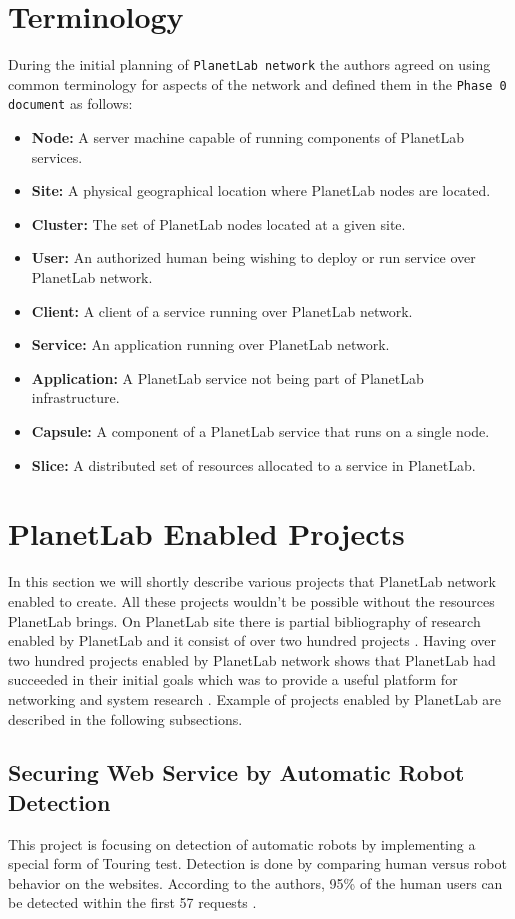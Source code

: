 \section{Terminology}
During the initial planning of \texttt{PlanetLab network} the authors agreed on using common terminology for aspects of the network and defined them in the \texttt{Phase 0 document} \cite{Roscoe_PDN-02-002} as follows:
\begin{itemize}
	\item \textbf{Node:} A server machine capable of running components of PlanetLab services.
	\item \textbf{Site:} A physical geographical location where PlanetLab nodes are located.
	\item \textbf{Cluster:} The set of PlanetLab nodes located at a given site.
	\item \textbf{User:} An authorized human being wishing to deploy or run service over PlanetLab network.
	\item \textbf{Client:} A client of a service running over PlanetLab network.
	\item \textbf{Service:} An application running over PlanetLab network.
	\item \textbf{Application:} A PlanetLab service not being part of PlanetLab infrastructure. 
	\item \textbf{Capsule:} A component of a PlanetLab service that runs on a single node.
	\item \textbf{Slice:} A distributed set of resources allocated to a service in PlanetLab.
\end{itemize}
\section{PlanetLab Enabled Projects}
In this section we will shortly describe various projects that PlanetLab network enabled to create. All these projects wouldn't be possible without the resources PlanetLab brings. On PlanetLab site there is partial bibliography of research enabled by PlanetLab and it consist of over two hundred projects \cite{planetlabmain}. Having over two hundred projects enabled by PlanetLab network shows that PlanetLab had succeeded in their initial goals which was to provide a useful platform for networking and system research \cite{Roscoe_PDN-02-002}. Example of projects enabled by PlanetLab are described in the following subsections.
\subsection{Securing Web Service by Automatic Robot Detection}
This project is focusing on detection of automatic robots by implementing a special form of Touring test. Detection is done by comparing human versus robot behavior on the websites. According to the authors, 95\% of the human users can be detected within the first 57 requests \cite{Park:2006:SWS:1267359.1267382}.
